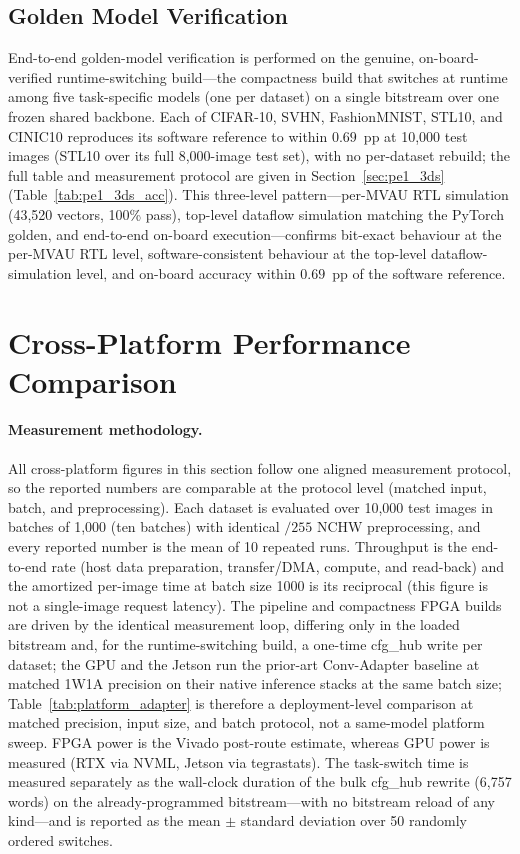\documentclass[12pt, a4paper]{report}
\numberwithin{equation}{chapter}
\numberwithin{figure}{chapter}
\numberwithin{table}{chapter}
\numberwithin{algorithm}{chapter}
\begin{document}
\subsection{Golden Model Verification}

End-to-end golden-model verification is performed on the genuine, on-board-verified runtime-switching build---the compactness build that switches at runtime among five task-specific models (one per dataset) on a single bitstream over one frozen shared backbone. Each of CIFAR-10, SVHN, FashionMNIST, STL10, and CINIC10 reproduces its software reference to within $0.69$~pp at 10{,}000 test images (STL10 over its full 8{,}000-image test set), with no per-dataset rebuild; the full table and measurement protocol are given in Section~\ref{sec:pe1_3ds} (Table~\ref{tab:pe1_3ds_acc}). This three-level pattern---per-MVAU RTL simulation (43{,}520 vectors, 100\% pass), top-level dataflow simulation matching the PyTorch golden, and end-to-end on-board execution---confirms bit-exact behaviour at the per-MVAU RTL level, software-consistent behaviour at the top-level dataflow-simulation level, and on-board accuracy within $0.69$~pp of the software reference.

\section{Cross-Platform Performance Comparison}
\label{sec:cross_platform}

\paragraph{Measurement methodology.} All cross-platform figures in this section follow one aligned measurement protocol, so the reported numbers are comparable at the protocol level (matched input, batch, and preprocessing). Each dataset is evaluated over 10{,}000 test images in batches of 1{,}000 (ten batches) with identical $/255$ NCHW preprocessing, and every reported number is the mean of 10 repeated runs. Throughput is the end-to-end rate (host data preparation, transfer/DMA, compute, and read-back) and the amortized per-image time at batch size 1000 is its reciprocal (this figure is not a single-image request latency). The pipeline and compactness FPGA builds are driven by the identical measurement loop, differing only in the loaded bitstream and, for the runtime-switching build, a one-time cfg\_hub write per dataset; the GPU and the Jetson run the prior-art Conv-Adapter baseline at matched 1W1A precision on their native inference stacks at the same batch size; Table~\ref{tab:platform_adapter} is therefore a deployment-level comparison at matched precision, input size, and batch protocol, not a same-model platform sweep. FPGA power is the Vivado post-route estimate, whereas GPU power is measured (RTX via NVML, Jetson via tegrastats). The task-switch time is measured separately as the wall-clock duration of the bulk cfg\_hub rewrite (6{,}757 words) on the already-programmed bitstream---with no bitstream reload of any kind---and is reported as the mean $\pm$ standard deviation over 50 randomly ordered switches.
\end{document}
